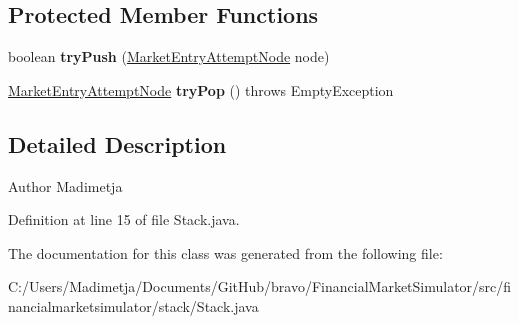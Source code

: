 \subsection*{Protected Member Functions}
\begin{DoxyCompactItemize}
\item 
\hypertarget{classfinancialmarketsimulator_1_1stack_1_1_stack_a2566c4821f0d3091cdac87b5ee7404bf}{boolean {\bfseries try\+Push} (\hyperlink{classfinancialmarketsimulator_1_1stack_1_1_market_entry_attempt_node}{Market\+Entry\+Attempt\+Node} node)}\label{classfinancialmarketsimulator_1_1stack_1_1_stack_a2566c4821f0d3091cdac87b5ee7404bf}

\item 
\hypertarget{classfinancialmarketsimulator_1_1stack_1_1_stack_aacd57a41238742e12b8ee9f20b93b162}{\hyperlink{classfinancialmarketsimulator_1_1stack_1_1_market_entry_attempt_node}{Market\+Entry\+Attempt\+Node} {\bfseries try\+Pop} ()  throws Empty\+Exception }\label{classfinancialmarketsimulator_1_1stack_1_1_stack_aacd57a41238742e12b8ee9f20b93b162}

\end{DoxyCompactItemize}


\subsection{Detailed Description}
\begin{DoxyAuthor}{Author}
Madimetja 
\end{DoxyAuthor}


Definition at line 15 of file Stack.\+java.



The documentation for this class was generated from the following file\+:\begin{DoxyCompactItemize}
\item 
C\+:/\+Users/\+Madimetja/\+Documents/\+Git\+Hub/bravo/\+Financial\+Market\+Simulator/src/financialmarketsimulator/stack/Stack.\+java\end{DoxyCompactItemize}
